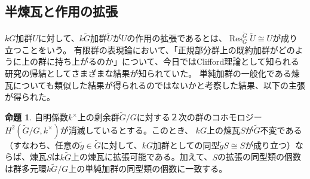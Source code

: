 \documentclass[a4paper,uplatex,dvipdfmx]{jsarticle}
\theoremstyle{definition}
\newtheorem{proposition}[theorem]{命題}
\newcommand{\restr}{{\operatorname{Res}\nolimits}}
\begin{document}
\subsection{半煉瓦と作用の拡張}
\(kG\)加群\(U\)に対して、\(k\widetilde{G}\)加群\(\widetilde{U}\)が\(U\)の作用の拡張であるとは、\(\restr_G^{\widetilde{G}} \widetilde{U} \cong U\)が成り立つことをいう。
有限群の表現論において、「正規部分群上の既約加群がどのように上の群に持ち上がるのか」について、今日ではClifford理論として知られる研究の帰結としてさまざまな結果が知られていた\cite{MR269750}。
単純加群の一般化である煉瓦についても類似した結果が得られるのではないかと考察した結果、以下の主張が得られた。
\begin{proposition}\label{brick extension 2021-07-04 06:43:21}
  自明係数\(k^\times\)上の剰余群\(\widetilde{G}/G\)に対する２次の群のコホモロジー\(H^2(\widetilde{G}/G,k^\times)\)が消滅しているとする。このとき、
  \(kG\)上の煉瓦\(S\)が\(\widetilde{G}\)不変である（すなわち、任意の\(\widetilde{g}\in \widetilde{G}\)に対して、\(kG\)加群としての同型\(\widetilde{g}S\cong S\)が成り立つ）ならば、煉瓦\(S\)は\(k\widetilde{G}\)上の煉瓦に拡張可能である。加えて、\(S\)の拡張の同型類の個数は群多元環\(k\widetilde{G}/G\)上の単純加群の同型類の個数に一致する。
\end{proposition}
\end{document}
